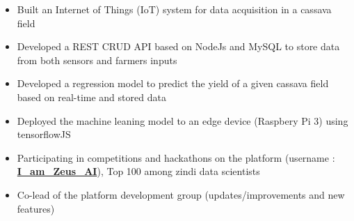 \documentclass[11pt,a4paper,ragged2e, withhyper]{altacv}
\begin{document}

\begin{fullwidth}
      \makecvheader
\end{fullwidth}



\begin{itemize}
      \item{Built an Internet of Things (IoT) system for data acquisition in a cassava field}
      \item{Developed a REST CRUD API based on NodeJs and MySQL to store data from both sensors and farmers inputs}
      \item{Developed a regression model to predict the yield of a given cassava field based on real-time and stored data}
      \item{Deployed the machine leaning model to an edge device (Raspbery Pi 3) using tensorflowJS}
\end{itemize}

\divider

\begin{itemize}
      \item{Participating in competitions and hackathons on the platform (username : \href{https://zindi.africa/users/I_am_Zeus_AI/competitions}{\textbf{I\_am\_Zeus\_AI}}), Top 100 among zindi data scientists}
      \item{Co-lead of the platform development group (updates/improvements and new features)}
\end{itemize}
\end{document}
